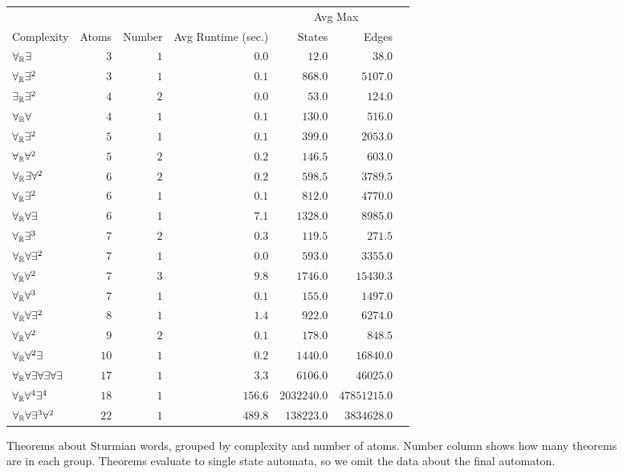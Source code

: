\begin{figure}
    \centering
    \footnotesize
    \vspace{-1em}
    \begin{tabular}{l|r|r|r|r|r|r|}
        & & & & \multicolumn{2}{c}{Avg Max} \\
        Complexity & Atoms & Number & Avg Runtime (sec.) & States & Edges \\ \hline
$\forall_{\mathbb{R}}\exists$ & $3$ & $1$ & $0.0$ & $12.0$ & $38.0$ \\
$\forall_{\mathbb{R}}\exists^2$ & $3$ & $1$ & $0.1$ & $868.0$ & $5107.0$ \\
$\exists_{\mathbb{R}}\exists^2$ & $4$ & $2$ & $0.0$ & $53.0$ & $124.0$ \\
$\forall_{\mathbb{R}}\forall$ & $4$ & $1$ & $0.1$ & $130.0$ & $516.0$ \\
$\forall_{\mathbb{R}}\exists^2$ & $5$ & $1$ & $0.1$ & $399.0$ & $2053.0$ \\
$\forall_{\mathbb{R}}\forall^2$ & $5$ & $2$ & $0.2$ & $146.5$ & $603.0$ \\
$\forall_{\mathbb{R}}\exists\forall^2$ & $6$ & $2$ & $0.2$ & $598.5$ & $3789.5$ \\
$\forall_{\mathbb{R}}\exists^2$ & $6$ & $1$ & $0.1$ & $812.0$ & $4770.0$ \\
$\forall_{\mathbb{R}}\forall\exists$ & $6$ & $1$ & $7.1$ & $1328.0$ & $8985.0$ \\
$\forall_{\mathbb{R}}\exists^3$ & $7$ & $2$ & $0.3$ & $119.5$ & $271.5$ \\
$\forall_{\mathbb{R}}\forall\exists^2$ & $7$ & $1$ & $0.0$ & $593.0$ & $3355.0$ \\
$\forall_{\mathbb{R}}\forall^2$ & $7$ & $3$ & $9.8$ & $1746.0$ & $15430.3$ \\
$\forall_{\mathbb{R}}\forall^3$ & $7$ & $1$ & $0.1$ & $155.0$ & $1497.0$ \\
$\forall_{\mathbb{R}}\forall\exists^2$ & $8$ & $1$ & $1.4$ & $922.0$ & $6274.0$ \\
$\forall_{\mathbb{R}}\forall^2$ & $9$ & $2$ & $0.1$ & $178.0$ & $848.5$ \\
$\forall_{\mathbb{R}}\forall^2\exists$ & $10$ & $1$ & $0.2$ & $1440.0$ & $16840.0$ \\
$\forall_{\mathbb{R}}\forall\exists\forall\exists\forall\exists$ & $17$ & $1$ & $3.3$ & $6106.0$ & $46025.0$ \\
$\forall_{\mathbb{R}}\forall^4\exists^4$ & $18$ & $1$ & $156.6$ & $2032240.0$ & $47851215.0$ \\
$\forall_{\mathbb{R}}\forall\exists^3\forall^2$ & $22$ & $1$ & $489.8$ & $138223.0$ & $3834628.0$ \\
    \end{tabular}
    \vspace{-0.5em}
    \caption{Theorems about Sturmian words, grouped by complexity and number of atoms.
        Number column shows how many theorems are in each group.
        Theorems evaluate to single state automata, so we omit the data about the final automaton.}
    \vspace{-2em}
    \label{fig:thm-performance-table}
\end{figure}

